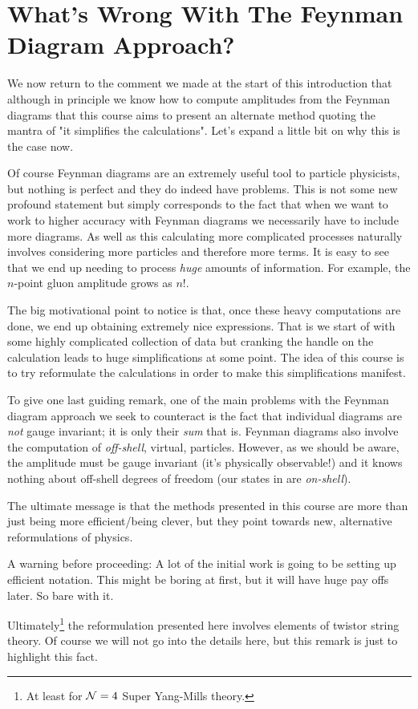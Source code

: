 \section{What's Wrong With The Feynman Diagram Approach?}

We now return to the comment we made at the start of this introduction that although in principle we know how to compute amplitudes from the Feynman diagrams that this course aims to present an alternate method quoting the mantra of "it simplifies the calculations". Let's expand a little bit on why this is the case now.

Of course Feynman diagrams are an extremely useful tool to particle physicists, but nothing is perfect and they do indeed have problems. This is not some new profound statement but simply corresponds to the fact that when we want to work to higher accuracy with Feynman diagrams we necessarily have to include more diagrams. As well as this calculating more complicated processes naturally involves considering more particles and therefore more terms. It is easy to see that we end up needing to process \textit{huge} amounts of information. For example, the $n$-point gluon amplitude grows as $n!$.

The big motivational point to notice is that, once these heavy computations are done, we end up obtaining extremely nice expressions. That is we start of with some highly complicated collection of data but cranking the handle on the calculation leads to huge simplifications at some point. The idea of this course is to try reformulate the calculations in order to make this simplifications manifest. 

To give one last guiding remark, one of the main problems with the Feynman diagram approach we seek to counteract is the fact that individual diagrams are \textit{not} gauge invariant; it is only their \textit{sum} that is. Feynman diagrams also involve the computation of \textit{off-shell}, virtual, particles. However, as we should be aware, the amplitude must be gauge invariant (it's physically observable!) and it knows nothing about off-shell degrees of freedom (our states in  are \textit{on-shell}). 

The ultimate message is that the methods presented in this course are more than just being more efficient/being clever, but they point towards new, alternative reformulations of physics. 

\br 
    A warning before proceeding: A lot of the initial work is going to be setting up efficient notation. This might be boring at first, but it will have huge pay offs later. So bare with it. 
\er 

\br 
    Ultimately\footnote{At least for $\mathcal{N}=4$ Super Yang-Mills theory.} the reformulation presented here involves elements of twistor string theory. Of course we will not go into the details here, but this remark is just to highlight this fact. 
\er